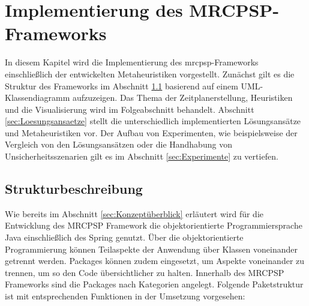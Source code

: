 \chapter{Implementierung des MRCPSP-Frameworks} \label{ch:Implementierung}
In diesem Kapitel wird die Implementierung des \ac{mrcpsp}-Frameworks einschließlich der entwickelten Metaheuristiken vorgestellt. Zunächst gilt es die Struktur des Frameworks im Abschnitt \ref{sec:Strukturbeschreibung} basierend auf einem UML-Klassendiagramm aufzuzeigen. Das Thema der Zeitplanerstellung, Heuristiken und die Visualisierung wird im Folgeabschnitt behandelt. Abschnitt \ref{sec:Loesungsansaetze} stellt die unterschiedlich implementierten Lösungsansätze und Metaheuristiken vor. Der Aufbau von Experimenten, wie beispielsweise der Vergleich von den Lösungsansätzen oder die Handhabung von Unsicherheitsszenarien gilt es im Abschnitt \ref{sec:Experimente} zu vertiefen. %

\section{Strukturbeschreibung} \label{sec:Strukturbeschreibung}

Wie bereits im Abschnitt \ref{sec:Konzeptüberblick} erläutert wird für die Entwicklung des MRCPSP Framework die objektorientierte Programmiersprache Java einschließlich des Spring genutzt. Über die objektorientierte Programmierung können Teilaspekte der Anwendung über Klassen voneinander getrennt werden. Packages können zudem eingesetzt, um Aspekte voneinander zu trennen, um so den Code übersichtlicher zu halten. Innerhalb des MRCPSP Frameworks sind die Packages nach Kategorien angelegt. Folgende Paketstruktur ist mit entsprechenden Funktionen in der Umsetzung vorgesehen:

